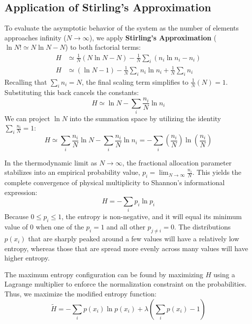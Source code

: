 \documentclass[11pt,a4paper]{article}
\begin{document}
\subsection{Application of Stirling's Approximation}
To evaluate the asymptotic behavior of the system as the number of elements approaches infinity ($N \to \infty$), we apply \textbf{Stirling's Approximation} ($\ln N! \simeq N \ln N - N$) to both factorial terms:
\begin{align}
H &\simeq \frac{1}{N} (N \ln N - N) - \frac{1}{N} \sum_{i} (n_i \ln n_i - n_i) \\
H &\simeq (\ln N - 1) - \frac{1}{N} \sum_{i} n_i \ln n_i + \frac{1}{N} \sum_{i} n_i
\end{align}
Recalling that $\sum_{i} n_i = N$, the final scaling term simplifies to $\frac{1}{N}(N) = 1$. Substituting this back cancels the constants:
\begin{equation}
H \simeq \ln N - \sum_{i} \frac{n_i}{N} \ln n_i
\end{equation}
We can project $\ln N$ into the summation space by utilizing the identity $\sum_{i} \frac{n_i}{N} = 1$:
\begin{equation}
H \simeq \sum_{i} \frac{n_i}{N} \ln N - \sum_{i} \frac{n_i}{N} \ln n_i = -\sum_{i} \left(\frac{n_i}{N}\right) \ln\left(\frac{n_i}{N}\right)
\end{equation}

In the thermodynamic limit as $N \to \infty$, the fractional allocation parameter stabilizes into an empirical probability value, $p_i = \lim_{N \to \infty} \frac{n_i}{N}$. This yields the complete convergence of physical multiplicity to Shannon's informational expression:
\begin{equation}
H = -\sum_{i} p_i \ln p_i
\end{equation}
Because $0 \le p_i \le 1$, the entropy is non-negative, and it will equal its minimum value of 0 when one of the $p_i = 1$ and all other $p_{j \neq i} = 0$. The distributions $p(x_i)$ that are sharply peaked around a few values will have a relatively low entropy, whereas those that are spread more evenly across many values will have higher entropy.

The maximum entropy configuration can be found by maximizing $H$ using a Lagrange multiplier to enforce the normalization constraint on the probabilities. Thus, we maximize the modified entropy function:
\begin{equation}
\tilde{H} = -\sum_{i} p(x_i) \ln p(x_i) + \lambda \left(\sum_{i} p(x_i) - 1\right)
\end{equation}
\end{document}
